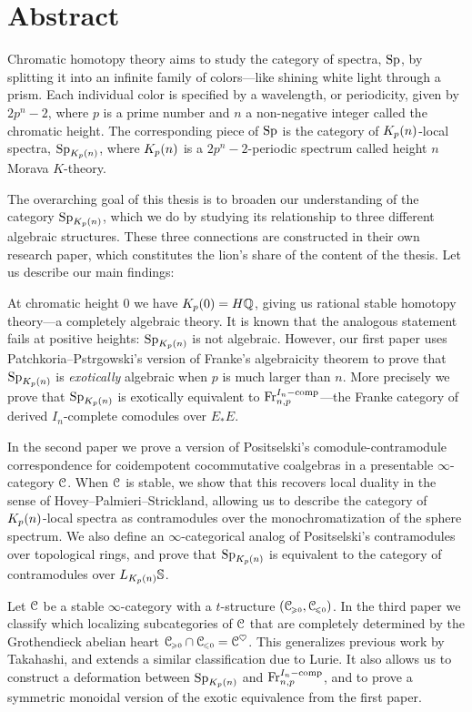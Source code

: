 

\section*{Abstract}

Chromatic homotopy theory aims to study the category of spectra, $\mathrm{Sp}$, by splitting it into an infinite family of colors---like shining white light through a prism. Each individual color is specified by a wavelength, or periodicity, given by $2p^n-2$, where $p$ is a prime number and $n$ a non-negative integer called the chromatic height. The corresponding piece of $\mathrm{Sp}$ is the category of ${K_p(n)}$-local spectra, $\mathrm{Sp}_{K_p(n)}$, where ${K_p(n)}$ is a $2p^n-2$-periodic spectrum called height $n$ Morava $K$-theory. 

The overarching goal of this thesis is to broaden our understanding of the category $\mathrm{Sp}_{K_p(n)}$, which we do by studying its relationship to three different algebraic structures. These three connections are constructed in their own research paper, which constitutes the lion's share of the content of the thesis. Let us describe our main findings:

At chromatic height $0$ we have $K_p(0) = H\mathbb{Q}$, giving us rational stable homotopy theory---a completely algebraic theory. It is known that the analogous statement fails at positive heights: $\mathrm{Sp}_{K_p(n)}$ is not algebraic. However, our first paper uses Patchkoria--Pstr\a{}gowski's version of Franke's algebraicity theorem to prove that $\mathrm{Sp}_{K_p(n)}$ is \emph{exotically} algebraic when $p$ is much larger than $n$. More precisely we prove that $\mathrm{Sp}_{K_p(n)}$ is exotically equivalent to $\mathrm{Fr}_{n,p}^{I_n-\mathrm{comp}}$---the Franke category of derived $I_n$-complete comodules over $E_*E$. 

In the second paper we prove a version of Positselski's comodule-contramodule correspondence for coidempotent cocommutative coalgebras in a presentable $\infty$-category $\EuScript{C}$. When $\EuScript{C}$ is stable, we show that this recovers local duality in the sense of Hovey--Palmieri--Strickland, allowing us to describe the category of ${K_p(n)}$-local spectra as contramodules over the monochromatization of the sphere spectrum. We also define an $\infty$-categorical analog of Positselski's contramodules over topological rings, and prove that $\mathrm{Sp}_{K_p(n)}$ is equivalent to the category of contramodules over $L_{K_p(n)} \mathbb{S}$. 

Let $\EuScript{C}$ be a stable $\infty$-category with a $t$-structure $(\EuScript{C}_{\hspace{-1pt}\scriptscriptstyle\geqslant 0}, \EuScript{C}_{\hspace{-1pt}\scriptscriptstyle\leqslant 0})$. In the third paper we classify which localizing subcategories of $\EuScript{C}$ that are completely determined by the Grothendieck abelian heart $\EuScript{C}_{\hspace{-1pt}\scriptscriptstyle\geqslant 0} \cap \EuScript{C}_{\hspace{-1pt}\scriptscriptstyle\leqslant 0} = \EuScript{C}^\heartsuit$. This generalizes previous work by Takahashi, and extends a similar classification due to Lurie. It also allows us to construct a deformation between $\mathrm{Sp}_{K_p(n)}$ and $\mathrm{Fr}_{n,p}^{I_n-\mathrm{comp}}$, and to prove a symmetric monoidal version of the exotic equivalence from the first paper. 




